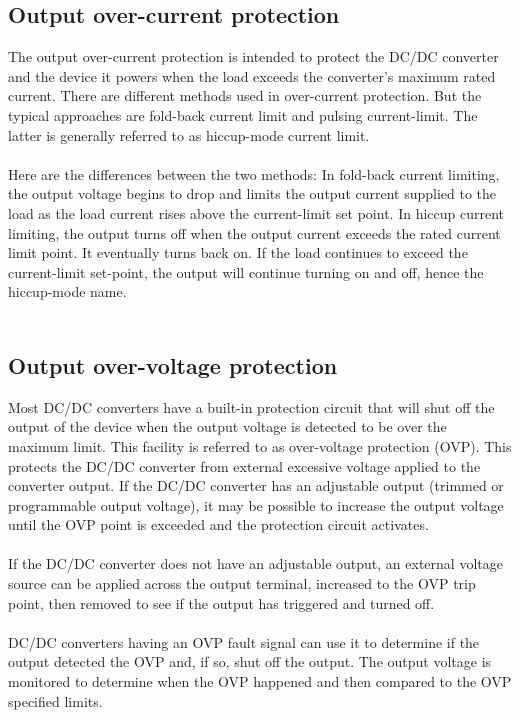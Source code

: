\subsection{Output over-current protection}

The output over-current protection is intended to protect the DC/DC converter and the device it powers when the load exceeds the converter’s maximum rated current. There are different methods used in over-current protection. But the typical approaches are fold-back current limit and pulsing current-limit. The latter is generally referred to as hiccup-mode current limit.
\\ \\
Here are the differences between the two methods: In fold-back current limiting, the output voltage begins to drop and limits the output current supplied to the load as the load current rises above the current-limit set point. In hiccup current limiting, the output turns off when the output current exceeds the rated current limit point. It eventually turns back on. If the load continues to exceed the current-limit set-point, the output will continue turning on and off, hence the hiccup-mode name.
\\ \\
\subsection{Output over-voltage protection} 

Most DC/DC converters have a built-in protection circuit that will shut off the output of the device when the output voltage is detected to be over the maximum limit. This facility is referred to as over-voltage protection (OVP). This protects the DC/DC converter from external excessive voltage applied to the converter output. If the DC/DC converter has an adjustable output (trimmed or programmable output voltage), it may be possible to increase the output voltage until the OVP point is exceeded and the protection circuit activates.
\\ \\
If the DC/DC converter does not have an adjustable output, an external voltage source can be applied across the output terminal, increased to the OVP trip point, then removed to see if the output has triggered and turned off.
\\ \\
DC/DC converters having an OVP fault signal can use it to determine if the output detected the OVP and, if so, shut off the output. The output voltage is monitored to determine when the OVP happened and then compared to the OVP specified limits.
\\ \\
